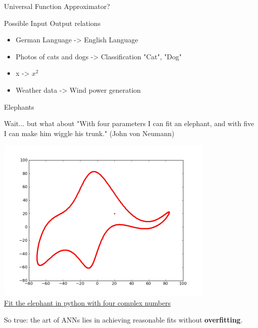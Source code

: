 \documentclass[color=usenames,dvipsnames]{beamer}
\begin{document}
\begin{frame}{Universal Function Approximator?} 


\vspace{1cm}

Possible Input Output relations
\begin{itemize}
	\item German Language -> English Language
	\item Photos of cats and dogs -> Classification "Cat", "Dog"
	\item x -> $x^2$
	\item Weather data -> Wind power generation	
\end{itemize}

\end{frame}

\begin{frame}{Elephants} 

Wait... but what about "With four parameters I can fit an elephant, and with five I can make him wiggle his trunk." (John von Neumann)\\


\begin{center}
	\includegraphics[width=0.5\linewidth]{../figures/elephant.png}\\

\href{https://www.johndcook.com/blog/2011/06/21/how-to-fit-an-elephant/}{\underline{Fit the elephant in python with four complex numbers}}

\end{center}

So true: the art of ANNs lies in achieving reasonable fits without \textbf{overfitting}.\\ 

\end{frame}
\end{document}
